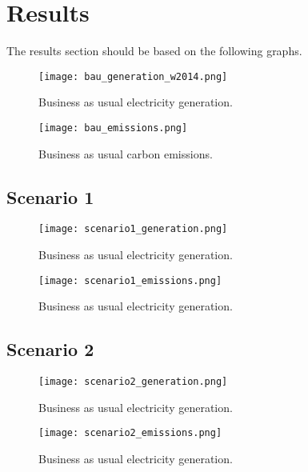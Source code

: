 \section{Results}

The results section should be based on the following graphs.

\begin{figure}[H]
	\texttt{[image: bau\_generation\_w2014.png]}
	\caption{Business as usual electricity generation.}
	\label{fig:bau_generation}
\end{figure}
\begin{figure}[H]
	\texttt{[image: bau\_emissions.png]}
	\caption{Business as usual carbon emissions.}
	\label{fig:bau_emissions}
\end{figure}
\subsection{Scenario 1}
\begin{figure}[H]
	\texttt{[image: scenario1\_generation.png]}
	\caption{Business as usual electricity generation.}
	\label{fig:}
\end{figure}
\begin{figure}[H]
	\texttt{[image: scenario1\_emissions.png]}
	\caption{Business as usual electricity generation.}
	\label{fig:}
\end{figure}
\subsection{Scenario 2}
\begin{figure}[H]
	\texttt{[image: scenario2\_generation.png]}
	\caption{Business as usual electricity generation.}
	\label{fig:}
\end{figure}
\begin{figure}[H]
	\texttt{[image: scenario2\_emissions.png]}
	\caption{Business as usual electricity generation.}
	\label{fig:}
\end{figure}
